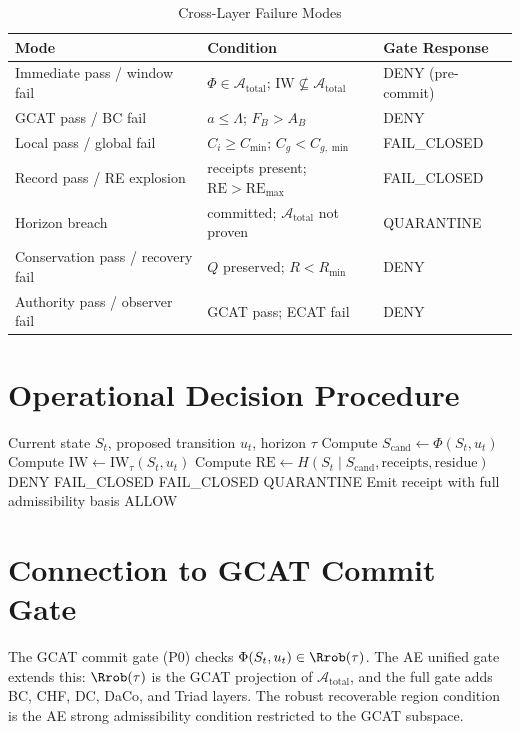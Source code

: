 \documentclass[letterpaper,10pt,conference]{ieeeconf}
\newcommand{\Atot}{\mathcal{A}_{\text{total}}}
\newcommand{\Lam}{\Lambda}
\newcommand{\Phiop}{\Phi}
\newcommand{\IW}{\mathrm{IW}}
\newcommand{\RE}{\mathrm{RE}}
\newcommand{\St}{S_t}
\newcommand{\ut}{u_t}
\begin{document}
\begin{table}[h]
\centering
\caption{Cross-Layer Failure Modes}
\begin{tabular}{lll}
\hline
Mode & Condition & Gate Response \\
\hline
Immediate pass / window fail & $\Phiop \in \Atot$; $\IW \not\subseteq \Atot$ & DENY (pre-commit) \\
GCAT pass / BC fail & $a \le \Lam$; $F_B > A_B$ & DENY \\
Local pass / global fail & $C_i \ge C_{\min}$; $C_g < C_{g,\min}$ & FAIL\_CLOSED \\
Record pass / RE explosion & receipts present; $\RE > \RE_{\max}$ & FAIL\_CLOSED \\
Horizon breach & committed; $\Atot$ not proven & QUARANTINE \\
Conservation pass / recovery fail & $Q$ preserved; $R < R_{\min}$ & DENY \\
Authority pass / observer fail & GCAT pass; ECAT fail & DENY \\
\hline
\end{tabular}
\end{table}

\section{Operational Decision Procedure}

\begin{algorithmic}[1]
\Require Current state $\St$, proposed transition $\ut$, horizon $\tau$
\State Compute $S_{\text{cand}} \gets \Phiop(\St, \ut)$
\State Compute $\IW \gets \IW_\tau(\St, \ut)$
\State Compute $\RE \gets H(\St \mid S_{\text{cand}}, \text{receipts}, \text{residue})$
\If{$\IW \not\subseteq \Atot$} \Return DENY \EndIf
\If{$\RE > \RE_{\max}$} \Return FAIL\_CLOSED \EndIf
{} \Return FAIL\_CLOSED \EndIf
{} \Return QUARANTINE \EndIf
\State Emit receipt with full admissibility basis
\Return ALLOW
\end{algorithmic}

\section{Connection to GCAT Commit Gate}

The GCAT commit gate (P0) checks $\Phiop(\St,\ut) \in \Rrob(\tau)$. The AE unified gate extends this: $\Rrob(\tau)$ is the GCAT projection of $\Atot$, and the full gate adds BC, CHF, DC, DaCo, and Triad layers. The robust recoverable region condition is the AE strong admissibility condition restricted to the GCAT subspace.
\end{document}
